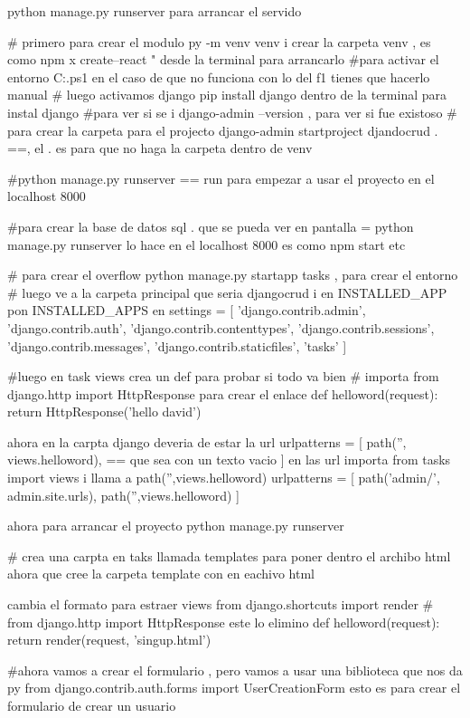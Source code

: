 
python manage.py runserver  para arrancar el servido 


# primero para crear el modulo  py -m venv venv i crear la carpeta venv , es como npm x create--react " desde la terminal
para arrancarlo  
#para activar el entorno C:\Users\david\Desktop\django\venv\Scripts\Activate.ps1
en el caso de que no funciona con lo del f1 tienes que hacerlo manual 
# luego activamos django  pip install django dentro de la terminal para instal django
#para ver si se i django-admin --version , para ver si fue existoso 
# para crear la carpeta para el projecto django-admin startproject djandocrud . ==, el . es para que no haga la carpeta dentro de venv

#python manage.py runserver  == run para empezar a usar el proyecto en el localhost 8000

#para crear la base de datos sql . que se pueda ver en pantalla = python manage.py runserver lo hace en el localhost 8000
es como npm start etc

# para crear el overflow    python manage.py startapp tasks , para crear el entorno 
# luego ve a la carpeta principal que seria djangocrud i en INSTALLED_APP pon INSTALLED_APPS  en settings = [
    'django.contrib.admin',
    'django.contrib.auth',
    'django.contrib.contenttypes',
    'django.contrib.sessions',
    'django.contrib.messages',
    'django.contrib.staticfiles',
    'tasks'
]

#luego en task views crea un def para probar si todo va bien 
# importa from django.http import HttpResponse para crear el enlace 
def helloword(request):
 return HttpResponse('hello david')

 ahora en la carpta django deveria de estar la url urlpatterns = [
    path('', views.helloword), == que sea con un texto vacio
]
 en las url importa from tasks import views  i llama a path('',views.helloword) urlpatterns = [
    path('admin/', admin.site.urls),
    path('',views.helloword)
]

ahora para arrancar el proyecto python manage.py runserver

# crea una carpta en taks llamada templates para poner dentro el archibo html 
 ahora que cree la carpeta template con en eachivo html 

 cambia el formato para estraer views  
 from django.shortcuts import render
# from django.http import HttpResponse este lo elimino 
def helloword(request):
 return render(request, 'singup.html')


 #ahora vamos a crear el formulario , pero vamos a usar una biblioteca que nos da py
 from django.contrib.auth.forms  import UserCreationForm 
  esto es para crear el formulario de crear un usuario 

